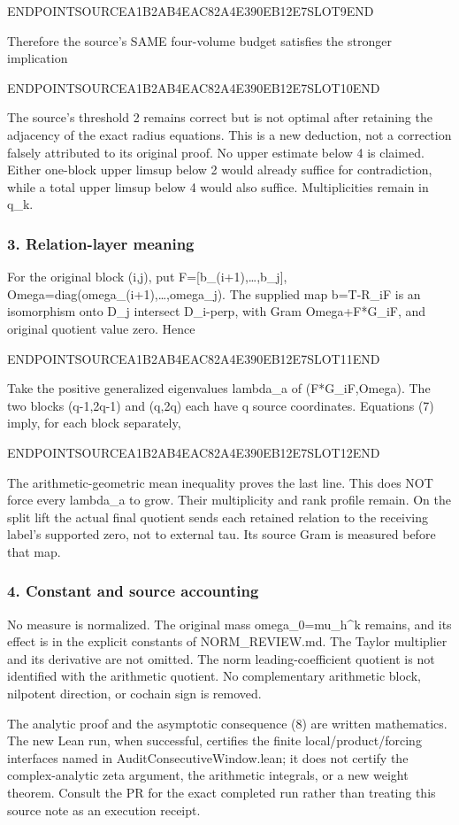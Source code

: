 ENDPOINTSOURCEA1B2AB4EAC82A4E390EB12E7SLOT9END

Therefore the source's SAME four-volume budget satisfies the stronger implication

ENDPOINTSOURCEA1B2AB4EAC82A4E390EB12E7SLOT10END

The source's threshold 2 remains correct but is not optimal after retaining the adjacency of the exact radius equations. This is a new deduction, not a correction falsely attributed to its original proof. No upper estimate below 4 is claimed. Either one-block upper limsup below 2 would already suffice for contradiction, while a total upper limsup below 4 would also suffice. Multiplicities remain in q\_k.

\subsubsection{3. Relation-layer meaning}\label{endpoint-pr25_consecutive_original--relation-layer-meaning}

For the original block (i,j), put F={[}b\_(i+1),\ldots,b\_j{]}, Omega=diag(omega\_(i+1),\ldots,omega\_j). The supplied map b=T-R\_iF is an isomorphism onto D\_j intersect D\_i-perp, with Gram Omega+F*G\_iF, and original quotient value zero. Hence

ENDPOINTSOURCEA1B2AB4EAC82A4E390EB12E7SLOT11END

Take the positive generalized eigenvalues lambda\_a of (F*G\_iF,Omega). The two blocks (q-1,2q-1) and (q,2q) each have q source coordinates. Equations (7) imply, for each block separately,

ENDPOINTSOURCEA1B2AB4EAC82A4E390EB12E7SLOT12END

The arithmetic-geometric mean inequality proves the last line. This does NOT force every lambda\_a to grow. Their multiplicity and rank profile remain. On the split lift the actual final quotient sends each retained relation to the receiving label's supported zero, not to external tau. Its source Gram is measured before that map.

\subsubsection{4. Constant and source accounting}\label{endpoint-pr25_consecutive_original--constant-and-source-accounting}

No measure is normalized. The original mass omega\_0=mu\_h\^{}k remains, and its effect is in the explicit constants of NORM\_REVIEW.md. The Taylor multiplier and its derivative are not omitted. The norm leading-coefficient quotient is not identified with the arithmetic quotient. No complementary arithmetic block, nilpotent direction, or cochain sign is removed.

The analytic proof and the asymptotic consequence (8) are written mathematics. The new Lean run, when successful, certifies the finite local/product/forcing interfaces named in AuditConsecutiveWindow.lean; it does not certify the complex-analytic zeta argument, the arithmetic integrals, or a new weight theorem. Consult the PR for the exact completed run rather than treating this source note as an execution receipt.
